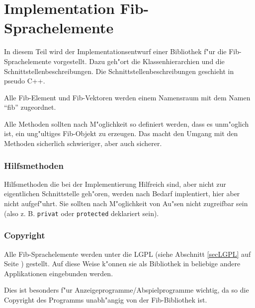 %
%
%
%

\graphicspath{{./klassendiagramme/}}
\graphicspath{{./klassendiagramme/}{../klassendiagramme}}


\newpage
\part{Implementation Fib-Sprachelemente}
\label{partImplementationFib}

In diesem Teil wird der Implementationsentwurf einer Bibliothek f"ur die Fib-Sprach\-ele\-mente vorgestellt. Dazu geh"ort die Klassenhierarchien und die Schnittstellenbeschreibungen. Die Schnittstellenbeschreibungen geschieht in pseudo C++.

Alle Fib-Element und Fib-Vektoren werden einem Namensraum mit dem Namen ``fib'' zugeordnet.

Alle Methoden sollten nach M"oglichkeit so definiert werden, dass es unm"oglich ist, ein ung"ultiges Fib-Objekt zu erzeugen. Das macht den Umgang mit den Methoden sicherlich schwieriger, aber auch sicherer.


\section{Hilfsmethoden}

Hilfsmethoden die bei der Implementierung Hilfreich sind, aber nicht zur eigentlichen Schnittstelle geh"oren, werden nach Bedarf implentiert, hier aber nicht aufgef"uhrt. Sie sollten nach M"oglichkeit von Au"sen nicht zugreifbar sein (also z. B. \verb|privat| oder \verb|protected| deklariert sein).


\section{Copyright}

Alle Fib-Sprachelemente werden unter die LGPL (siehe Abschnitt \ref{secLGPL} auf Seite \pageref{secLGPL}) gestellt. Auf diese Weise k"onnen sie als Bibliothek in beliebige andere Applikationen eingebunden werden.

Dies ist besonders f"ur Anzeigeprogramme/Abspielprogramme wichtig, da so die Copyright des Programms unabh"angig von der Fib-Bibliothek ist.


